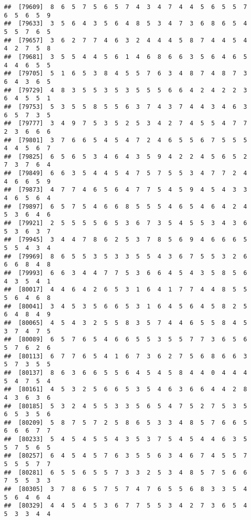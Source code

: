 \documentclass[
]{book}
\begin{document}
\begin{verbatim}
##  [79609]  8  6  5  7  5  6  5  7  4  3  4  7  4  4  5  6  5  5  7  6  5  6  5  9
##  [79633]  3  5  6  4  3  5  6  4  8  5  3  4  7  3  6  8  6  5  4  5  5  7  6  5
##  [79657]  3  6  2  7  7  4  6  3  2  4  4  4  5  8  7  4  4  5  4  4  2  7  5  8
##  [79681]  3  5  5  4  4  5  6  1  4  6  8  6  6  3  5  6  4  6  5  4  4  6  5  5
##  [79705]  5  1  6  5  3  8  4  5  5  7  6  3  4  8  7  4  8  7  3  6  4  3  6  5
##  [79729]  4  8  3  5  5  3  5  3  5  5  5  6  6  4  2  4  2  2  3  6  4  5  5  1
##  [79753]  5  3  5  5  8  5  5  6  3  7  4  3  7  4  4  3  4  6  3  6  5  7  3  5
##  [79777]  3  4  9  7  5  3  5  2  5  3  4  2  7  4  5  5  4  7  7  2  3  6  6  6
##  [79801]  3  7  6  6  5  4  5  4  7  2  4  6  5  5  6  7  5  5  5  4  4  5  6  7
##  [79825]  6  5  6  5  3  4  6  4  3  5  9  4  2  2  4  5  6  5  2  7  3  7  6  4
##  [79849]  6  6  3  5  4  4  5  4  7  5  7  5  5  3  4  7  7  2  4  4  6  6  5  9
##  [79873]  4  7  7  4  6  5  6  4  7  7  5  4  5  9  4  5  4  3  3  4  6  5  6  4
##  [79897]  6  5  7  5  4  6  6  8  5  5  5  4  6  5  4  6  4  2  4  5  3  6  4  6
##  [79921]  2  5  5  5  5  6  5  3  6  7  3  5  4  5  5  3  4  3  6  5  3  6  3  7
##  [79945]  3  4  4  7  8  6  2  5  3  7  8  5  6  9  4  6  6  6  5  5  5  4  3  4
##  [79969]  8  6  5  5  3  5  3  3  5  5  4  3  6  7  5  5  3  2  6  6  6  8  4  8
##  [79993]  6  6  3  4  4  7  7  5  3  6  6  4  5  4  3  5  8  5  6  4  3  5  4  1
##  [80017]  4  4  6  4  2  6  5  3  1  6  4  1  7  7  4  4  8  5  5  5  6  4  6  8
##  [80041]  3  4  5  3  5  6  6  5  3  1  6  4  5  6  4  5  8  2  5  6  4  8  4  9
##  [80065]  4  5  4  3  2  5  5  8  3  5  7  4  4  6  5  5  8  4  5  3  7  4  7  5
##  [80089]  6  5  7  6  5  4  6  6  5  5  3  5  5  7  7  3  6  5  6  5  7  6  2  6
##  [80113]  6  7  7  6  5  4  1  6  7  3  6  2  7  5  6  8  6  6  3  5  7  3  5  5
##  [80137]  8  6  3  6  6  5  5  6  4  5  4  5  8  4  4  0  4  4  4  5  4  7  5  4
##  [80161]  4  5  3  2  5  6  6  5  3  5  4  6  3  6  6  4  4  2  8  4  3  6  3  6
##  [80185]  5  3  2  4  5  5  3  3  5  6  5  4  7  5  2  7  5  3  5  6  5  3  5  6
##  [80209]  5  8  7  5  7  2  5  8  6  5  3  3  4  8  5  7  6  6  5  6  6  6  7  7
##  [80233]  5  4  5  4  5  5  4  3  5  3  7  5  4  5  4  4  6  3  5  5  7  5  6  5
##  [80257]  6  4  5  4  5  7  6  3  5  5  6  3  4  6  7  4  5  5  7  5  5  5  7  7
##  [80281]  6  5  5  6  5  5  7  3  3  2  5  3  4  8  5  7  5  6  6  7  5  5  3  3
##  [80305]  3  7  8  6  5  7  5  7  4  7  6  5  5  6  8  3  3  5  4  5  6  4  6  4
##  [80329]  4  4  5  4  5  3  6  7  7  5  5  3  4  2  7  3  6  5  4  5  3  3  4  4

\end{verbatim}
\end{document}
